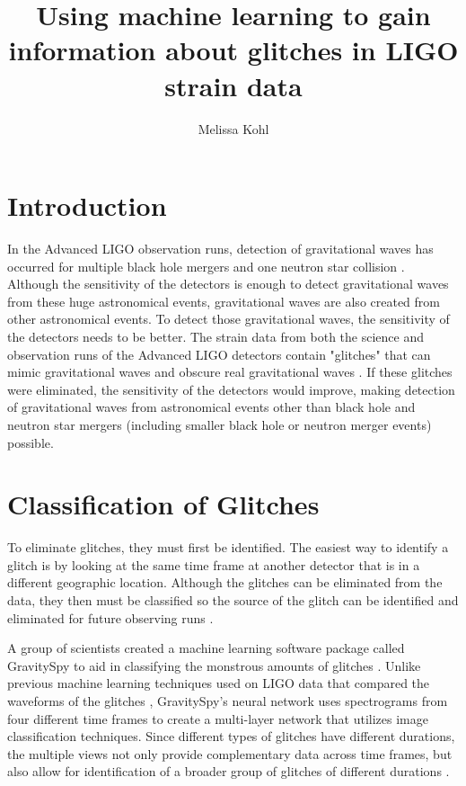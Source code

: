 \documentclass[a4paper]{article}
\title{Using machine learning to gain information about glitches in LIGO strain data}
\author{Melissa Kohl}
\begin{document}
\maketitle

\section{Introduction}

In the Advanced LIGO observation runs, detection of gravitational waves has occurred for multiple black hole mergers and one neutron star collision \cite{Zevin:2016}. Although the sensitivity of the detectors is enough to detect gravitational waves from these huge astronomical events, gravitational waves are also created from other astronomical events. To detect those gravitational waves, the sensitivity of the detectors needs to be better. The strain data from both the science and observation runs of the Advanced LIGO detectors contain "glitches" that can mimic gravitational waves and obscure real gravitational waves \cite{Zevin:2016}. If these glitches were eliminated, the sensitivity of the detectors would improve, making detection of gravitational waves from astronomical events other than black hole and neutron star mergers (including smaller black hole or neutron merger events) possible. 

\section{Classification of Glitches}

To eliminate glitches, they must first be identified. The easiest way to identify a glitch is by looking at the same time frame at another detector that is in a different geographic location. Although the glitches can be eliminated from the data, they then must be classified so the source of the glitch can be identified and eliminated for future observing runs \cite{Mukherjee:2010}. 

A group of scientists created a machine learning software package called GravitySpy to aid in classifying the monstrous amounts of glitches \cite{Zevin:2016}. Unlike previous machine learning techniques used on LIGO data that compared the waveforms of the glitches \cite{Mukherjee:2010}, GravitySpy's neural network uses spectrograms from four different time frames to create a multi-layer network that utilizes image classification techniques. Since different types of glitches have different durations, the multiple views not only provide complementary data across time frames, but also allow for identification of a broader group of glitches of different durations \cite{Bahaadini:2017}.  
\end{document}
